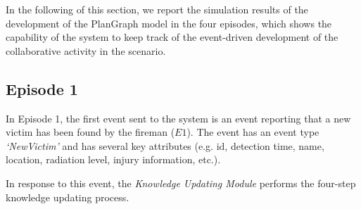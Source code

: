 In the following of this section, we report the simulation results of the development of the PlanGraph model in the four episodes, which shows the capability of the system to keep track of the event-driven development of the collaborative activity in the scenario.

\subsection{Episode 1} %
\label{sub:episode_1}
In Episode 1, the first event sent to the system is an event reporting that a new victim has been found by the fireman ($E1$). The event has an event type \emph{`NewVictim'} and has several key attributes (e.g. id, detection time, name, location, radiation level, injury information, etc.). 

In response to this event, the \emph{Knowledge Updating Module} performs the four-step knowledge updating process.

